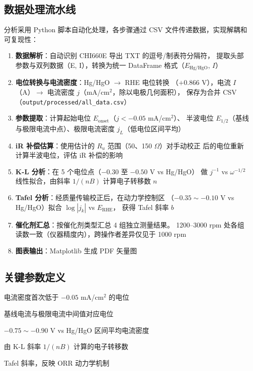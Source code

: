 \documentclass[12pt,a4paper]{ctexart}
\begin{document}
\subsection{数据处理流水线}

分析采用 Python 脚本自动化处理，各步骤通过 CSV 文件传递数据，实现解耦和可复现性：

\begin{enumerate}[leftmargin=1.5cm]
  \item \textbf{数据解析}：自动识别 CHI660E 导出 TXT 的逗号/制表符分隔符，
  提取头部参数与双列数据（E, I），转换为统一 DataFrame 格式（$E_{\text{Hg/HgO}}$,
  $I$）
  \item \textbf{电位转换与电流密度}：Hg/HgO $\rightarrow$ RHE 电位转换
  （$+0.866$ V），电流 $I$（A）$\rightarrow$ 电流密度 $j$（mA/cm$^2$，除以电极几何面积），
  保存为合并 CSV（\texttt{output/processed/all\_data.csv}）
  \item \textbf{参数提取}：计算起始电位 $E_{\text{onset}}$（$j < -0.05$ mA/cm$^2$）、
  半波电位 $E_{1/2}$（基线与极限电流中点）、极限电流密度 $j_L$（低电位区间平均）
  \item \textbf{iR 补偿估算}：使用估计的 $R_u$ 范围（50、150 $\Omega$）对手动校正
  后的电位重新计算半波电位，评估 iR 补偿的影响
  \item \textbf{K-L 分析}：在 5 个电位点（$-0.30$ 至 $-0.50$ V vs Hg/HgO）
  做 $j^{-1}$ vs $\omega^{-1/2}$ 线性拟合，由斜率 $1/(nB)$ 计算电子转移数 $n$
  \item \textbf{Tafel 分析}：经质量传输校正后，在动力学控制区
  （$-0.35 \sim -0.10$ V vs Hg/HgO）拟合 $\log|j_k|$ vs $E_{\text{RHE}}$，
  获得 Tafel 斜率 $b$
  \item \textbf{催化剂汇总}：按催化剂类型汇总 4 组独立测量结果。
  1200--3000 rpm 处各组读数一致（仪器精度内），跨操作者差异仅见于 1000 rpm
  \item \textbf{图表输出}：Matplotlib 生成 PDF 矢量图
\end{enumerate}

\subsection{关键参数定义}

\begin{description}[leftmargin=2.2cm]
  \item[$E_{\text{onset}}$] 电流密度首次低于 $-0.05$ mA/cm$^2$ 的电位
  \item[$E_{1/2}$] 基线电流与极限电流中间值对应电位
  \item[$j_L$] $-0.75 \sim -0.90$ V vs Hg/HgO 区间平均电流密度
  \item[$n$] 由 K-L 斜率 $1/(nB)$ 计算的电子转移数
  \item[$b$] Tafel 斜率，反映 ORR 动力学机制
\end{description}
\end{document}
